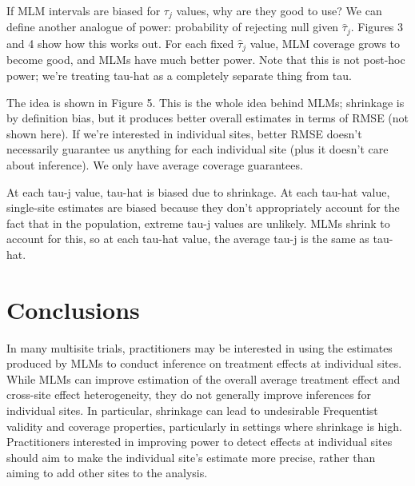 \documentclass[]{article}
\begin{document}
If MLM intervals are biased for $\tau_j$ values, why are they good to use?
We can define another analogue of power: probability of rejecting null given $\hat{\tau}_j$.
Figures 3 and 4 show how this works out.
For each fixed $\hat{\tau}_j$ value, MLM coverage grows to become good, and MLMs have much better power.
Note that this is not post-hoc power; we're treating tau-hat as a completely separate thing from tau.

The idea is shown in Figure 5.
This is the whole idea behind MLMs; shrinkage is by definition bias, but it produces better overall estimates in terms of RMSE (not shown here).
If we're interested in individual sites, better RMSE doesn't necessarily guarantee us anything for each individual site (plus it doesn't care about inference).
We only have average coverage guarantees.

At each tau-j value, tau-hat is biased due to shrinkage.
At each tau-hat value, single-site estimates are biased because they don't appropriately account for the fact that in the population, extreme tau-j values are unlikely.
MLMs shrink to account for this, so at each tau-hat value, the average tau-j is the same as tau-hat.

\section{Conclusions}

In many multisite trials, practitioners may be interested in using the estimates produced by MLMs to conduct inference on treatment effects at individual sites.
While MLMs can improve estimation of the overall average treatment effect and cross-site effect heterogeneity, they do not generally improve inferences for individual sites.
In particular, shrinkage can lead to undesirable Frequentist validity and coverage properties, particularly in settings where shrinkage is high.
Practitioners interested in improving power to detect effects at individual sites should aim to make the individual site's estimate more precise, rather than aiming to add other sites to the analysis.


	
\end{document}
